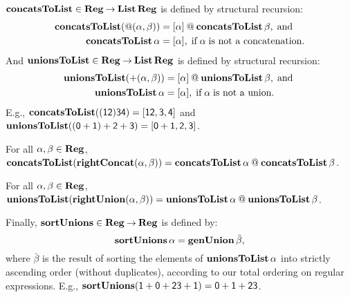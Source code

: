 $\mathbf{concatsToList}\in\mathbf{Reg}\mathbin{\to}\mathbf{List}\,\mathbf{Reg}$ is defined by structural
recursion:
\begin{align*}
\mathbf{concatsToList}({@}(\alpha, \beta)) &=
[\alpha] \mathbin{@} \mathbf{concatsToList}\,\beta, \;\allowbreak\mbox{and}\allowbreak\; \\
\mathbf{concatsToList}\,\alpha &= [\alpha],
\;\allowbreak\mbox{if}\allowbreak\; \alpha \;\allowbreak\mbox{is not a concatenation}\allowbreak.
\end{align*}
And $\mathbf{unionsToList}\in\mathbf{Reg}\mathbin{\to}\mathbf{List}\,\mathbf{Reg}$ is defined by structural
recursion:
\begin{align*}
\mathbf{unionsToList}({+}(\alpha, \beta)) &=
[\alpha] \mathbin{@} \mathbf{unionsToList}\,\beta, \;\allowbreak\mbox{and}\allowbreak\; \\
\mathbf{unionsToList}\,\alpha &= [\alpha],
\;\allowbreak\mbox{if}\allowbreak\; \alpha \;\allowbreak\mbox{is not a union}\allowbreak.
\end{align*}
E.g., $\mathbf{concatsToList}(\mathsf{(12)34}) = [\mathsf{12, 3, 4}]$
and $\mathbf{unionsToList}(\mathsf{(0+1)+2+3}) = [\mathsf{0 + 1, 2, 3}]$.

\begin{lemma}
\label{ConcatsToListRightConcat}
For all $\alpha,\beta\in\mathbf{Reg}$,
$\mathbf{concatsToList}(\mathbf{rightConcat}(\alpha,\beta)) = \mathbf{concatsToList}\,\alpha
\mathbin{@} \mathbf{concatsToList}\,\beta$.
\end{lemma}

\begin{lemma}
\label{UnionsToListRightUnion}
For all $\alpha,\beta\in\mathbf{Reg}$,
$\mathbf{unionsToList}(\mathbf{rightUnion}(\alpha,\beta)) = \mathbf{unionsToList}\,\alpha
  \mathbin{@} \mathbf{unionsToList}\,\beta$.
\end{lemma}

Finally, $\mathbf{sortUnions}\in\mathbf{Reg}\mathbin{\to}\mathbf{Reg}$ is defined by:
\begin{displaymath}
\mathbf{sortUnions}\,\alpha = \mathbf{genUnion}\,\bar{\beta} ,
\end{displaymath}
where $\bar{\beta}$ is the result of sorting the elements of
$\mathbf{unionsToList}\,\alpha$ into strictly ascending order (without
duplicates), according to our total ordering on regular expressions.
E.g., $\mathbf{sortUnions}(\mathsf{1 + 0 + 23 + 1}) = \mathsf{0 + 1 + 23}$.


